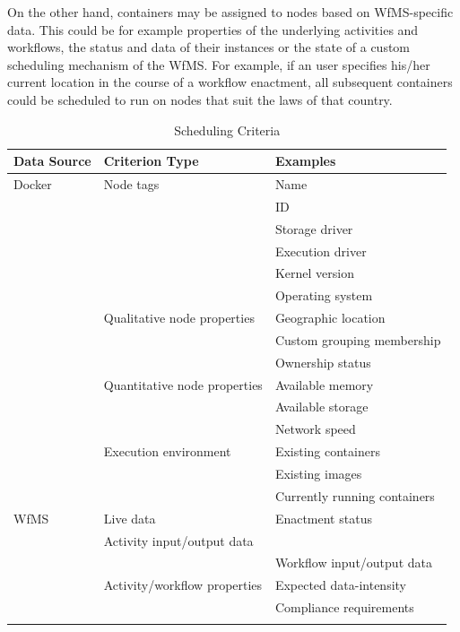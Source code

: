     On the other hand, containers may be assigned to nodes based on \ac{WfMS}-specific data. This could be for example properties of the underlying activities and workflows, the status and data of their instances or the state of a custom scheduling mechanism of the \ac{WfMS}. For example, if an user specifies his/her current location in the course of a workflow enactment, all subsequent containers could be scheduled to run on nodes that suit the laws of that country.

    \begin{table}[!htbp]
      \centering
      \begin{tabular}{l l l}
        \toprule
        Data Source & Criterion Type & Examples \\
        \midrule
        Docker
          & Node tags
            & Name \\
            && \ac{ID} \\
            && Storage driver \\
            && Execution driver \\
            && Kernel version  \\
            && Operating system \\ [1.2ex]
          & Qualitative node properties
            & Geographic location\\
            && Custom grouping membership\\
            && Ownership status\\ [1.2ex]
          & Quantitative node properties
            & Available memory \\
            && Available storage \\
            && Network speed \\ [1.2ex]
          & Execution environment
            & Existing containers \\
            && Existing images \\
            && Currently running containers \\ [1.4ex]
        WfMS
          & Live data
            & Enactment status \\
            & Activity input/output data \\
            && Workflow input/output data \\ [1.2ex]
          & Activity/workflow properties
            & Expected data-intensity \\
            && Compliance requirements\\
            &&\\ [1.2ex]
        \bottomrule
      \end{tabular}
      \label{tab:scheduling_criteria}
      \caption{Scheduling Criteria}
    \end{table}

